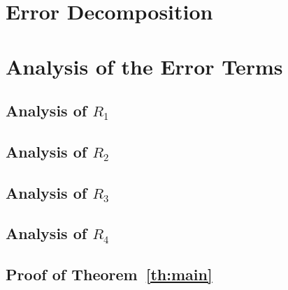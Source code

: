 \section{Error Decomposition}
  
\section{Analysis of the Error Terms}
  \subsection{Analysis of $R_1$}
  \label{r_1_rem}
    
  \subsection{Analysis of $R_2$}
    
  \subsection{Analysis of $R_3$}
    
    \newpage
  \subsection{Analysis of $R_4$}
    
  \subsection{Proof of Theorem~\ref{th:main}}
    
